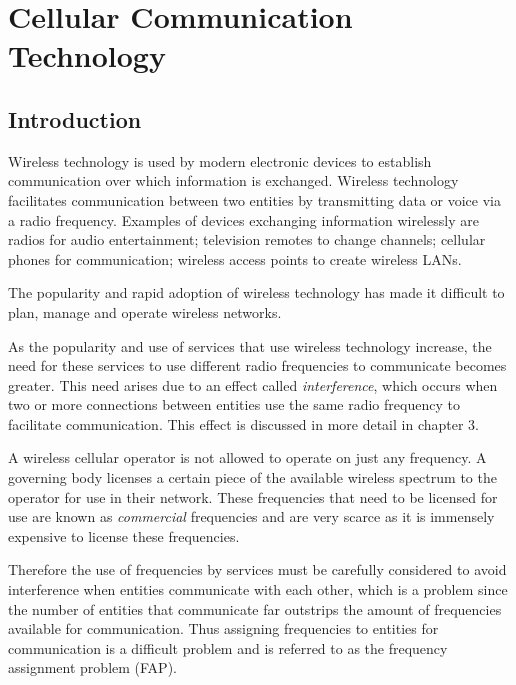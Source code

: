 \chapter{Cellular Communication Technology}
\label{chpt:celltech}
\section{Introduction}
 Wireless technology is used by modern electronic devices to establish communication over which information is exchanged\cite{Karen2004}. Wireless technology facilitates communication between two entities by transmitting data or voice via a radio frequency\cite{Karen2004}. Examples of devices exchanging information wirelessly are radios for audio entertainment; television remotes to change channels; cellular phones for communication; wireless access points to create wireless LANs\cite{Karen2004}.

The popularity and rapid adoption of wireless technology has made it difficult to plan, manage and operate wireless networks\cite{Karen2004}. 

As the popularity and use of services that use wireless technology increase, the need for these services to use different radio frequencies to communicate becomes greater\cite{wirelesstelcoMullet}. This need arises due to an effect called \emph{interference}, which occurs when two or more connections between entities use the same radio frequency to facilitate communication\cite{wirelesstelcoMullet}. This effect is discussed in more detail in chapter 3.

A wireless cellular operator is not allowed to operate on just any frequency. A governing body licenses a certain piece of the available wireless spectrum to the operator for use in their network\cite{FAPRAMColouring}. These frequencies that need to be licensed for use are known as \emph{commercial} frequencies and are very scarce as it is immensely expensive to license these frequencies\cite{FAPRAMColouring}. 

Therefore the use of frequencies by services must be carefully considered to avoid interference when entities communicate with each other, which is a problem since the number of entities that communicate far outstrips the amount of frequencies available for communication\cite{wirelesstelcoMullet}. Thus assigning frequencies to entities for communication is a difficult problem and is referred to as the frequency assignment problem (FAP)\cite{Karen2004,Eisenblatter}.

